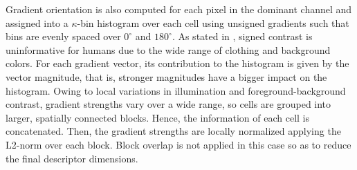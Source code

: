 \documentclass[10pt,twocolumn,letterpaper]{article}
\begin{document}




Gradient orientation is also computed for each pixel in the dominant channel and assigned into a $\kappa$-bin histogram over each cell using unsigned gradients such that bins are evenly spaced over $0^\circ$ and $180^\circ$. As stated in \cite{dalal2005histograms}, signed contrast is uninformative for humans due to the wide range of clothing and background colors. For each gradient vector, its contribution to the histogram is given by the vector magnitude, that is, stronger magnitudes have a bigger impact on the histogram. Owing to local variations in illumination and foreground-background contrast, gradient strengths vary over a wide range, so cells are grouped into larger, spatially connected blocks. Hence, the information of each cell is concatenated. Then, the gradient strengths are locally normalized applying the L2-norm over each block. Block overlap is not applied in this case so as to reduce the final descriptor dimensions. 
\end{document}
